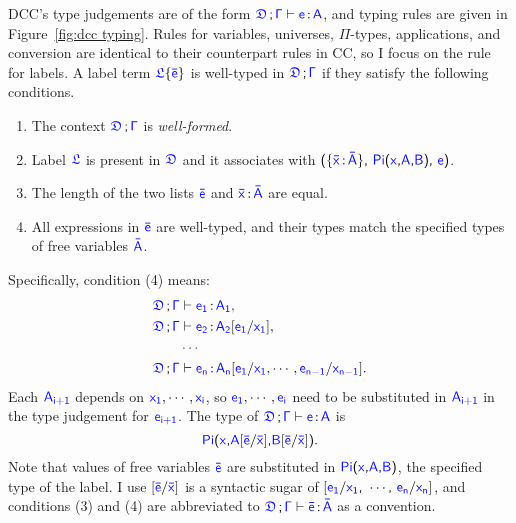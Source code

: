 DCC's type judgements are of the form $\targetcon \vdash \itemtype{e}{A}$, and
typing rules are given in Figure~\ref{fig:dcc typing}. Rules for variables, universes, $\Pi$-types, applications, and conversion are identical to their counterpart rules in CC, so I focus on the rule for labels. A label term $\targetlab{\flabel}{\bar{e}}$ is well-typed in $\targetcon$ if they satisfy the following conditions.
\begin{enumerate}
	\item The context $\targetcon$ is \textit{well-formed}.
	\item Label $\target{\flabel}$ is present in $\target{\fdef}$ and it associates with 
		$\textsf{(}\{\itemtype{\bar{x}}{\bar{A}}\}\textsf{,}\ \targetpi{x}{A}{B} \textsf{,}\ \target{e} \textsf{)}$.
	\item The length of the two lists $\target{\bar{e}}$ and $\itemtype{\bar{x}}{\bar{A}}$ are equal. 
	\item All expressions in $\target{\bar{e}}$ are well-typed, and their types match the specified types of free variables $\target{\bar{A}}$. 
\end{enumerate}
Specifically, condition (4) means:
\begin{align*}
	\targetcon &\vdash \itemtype{e_1}{A_1},\\
	\targetcon &\vdash \itemtype{e_2}{A_2}\targetsub{e_1}{x_1},\\
	&\cdots\\
	\targetcon &\vdash \itemtype{e_n}{A_n}[\target{e_1} \slash \target{x_1}, \cdots, \target{e_{n-1}} \slash \target{x_{n-1}}].
\end{align*}
Each $\target{A_{i+1}}$ depends on $\target{x_1}, \cdots, \target{x_i}$, so $\target{e_1}, \cdots, \target{e_i}$ need to be substituted in $\target{A_{i+1}}$ in the type judgement for $\target{e_{i+1}}$. The type of $\targetcon \vdash \itemtype{e}{A}$ is
\begin{equation*}
\target{Pi}\textsf{(}\target{x}\textsf{,} \target{A} \targetsub{\bar{e}}{\bar{x}}\textsf{,} \target{B} \targetsub{\bar{e}}{\bar{x}}\textsf{)}.
\end{equation*}
Note that values of free variables $\target{\bar{e}}$ are substituted in $\targetpi{x}{A}{B}$, the specified type of the label. I use $\targetsub{\bar{e}}{\bar{x}}$ is a syntactic sugar of $[\target{e_1}\slash\target{x_1}\sfcomma \cdots\sfcomma \target{e_n}\slash\target{x_n}]$, and conditions (3) and (4) are abbreviated to $\targetcon \vdash \itemtype{\bar{e}}{\bar{A}}$ as a convention.

